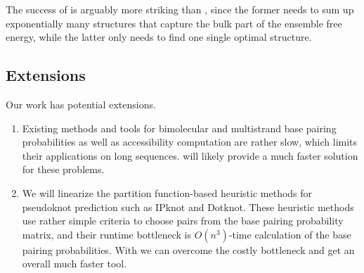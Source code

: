 \vspace{-0.2cm}
The success of \linearpartition is arguably more striking than \linearfold,
since the former needs to sum up exponentially many structures
that capture the bulk part of the ensemble free energy,
while the latter only needs to find one single optimal structure.

\vspace{-0.2cm}
\subsection{Extensions}

Our work has potential extensions.
\begin{enumerate}
  \vspace{-0.2cm}
  \setlength{\itemsep}{0pt}%
\item 
  Existing methods and tools for %
  bimolecular and multistrand 
  base pairing probabilities as well as accessibility computation %
\cite{chitsaz+:2009, bernhart+:2006b, Dirks+:2007, DiChiacchio+:2016} are rather slow, %
which limits their applications on long sequences. 
\linearpartition will likely provide a much faster solution for these problems. 

\item 
We will linearize the partition function-based heuristic methods for pseudoknot prediction such as 
IPknot and Dotknot. 
These heuristic methods use rather simple criteria to choose pairs from the base pairing probability matrix,
and their runtime bottleneck is $O(n^3)$-time calculation of the base pairing probabilities.
With \linearpartition we can overcome the costly bottleneck %
and get an overall much faster tool. %


\end{enumerate}
